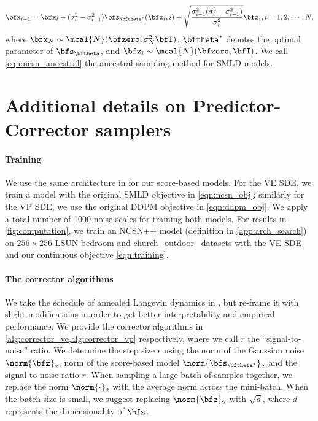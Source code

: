 \begin{align}
    \bfx_{i-1} = \bfx_i + (\sigma_i^2 - \sigma_{i-1}^2) \bfs_{\bftheta^*}(\bfx_i, i) + \sqrt{\frac{\sigma_{i-1}^2 (\sigma_i^2 - \sigma_{i-1}^2)}{\sigma_i^2}} \bfz_i, i=1,2,\cdots, N, \label{eqn:ncsn_ancestral}
\end{align}
where $\bfx_N \sim \mcal{N}(\bfzero, \sigma_N^2 \bfI)$, $\bftheta^*$ denotes the optimal parameter of $\bfs_\bftheta$, and $\bfz_i \sim \mcal{N}(\bfzero, \bfI)$. We call \cref{eqn:ncsn_ancestral} the ancestral sampling method for SMLD models.


\section{Additional details on Predictor-Corrector samplers}\label{app:pc}
\paragraph{Training} 
We use the same architecture in \cite{ho2020denoising} for our score-based models. For the VE SDE, we train a model with the original SMLD objective in \cref{eqn:ncsn_obj}; similarly for the VP SDE, we use the original DDPM objective in \cref{eqn:ddpm_obj}. We apply a total number of 1000 noise scales for training both models. For results in \cref{fig:computation}, we train an NCSN++ model (definition in \cref{app:arch_search}) on $256\times 256$ LSUN bedroom and church\_outdoor~\citep{yu2015lsun} datasets with the VE SDE and our continuous objective \cref{eqn:training}.

\paragraph{The corrector algorithms} We take the schedule of annealed Langevin dynamics in \citet{song2019generative}, but re-frame it with slight modifications in order to get better interpretability and empirical performance. We provide the corrector algorithms in \cref{alg:corrector_ve,alg:corrector_vp} respectively, where we call $r$ the ``signal-to-noise'' ratio. We determine the step size $\epsilon$ using the norm of the Gaussian noise $\norm{\bfz}_2$, norm of the score-based model $\norm{\bfs_{\bftheta^*}}_2$ and the signal-to-noise ratio $r$. When sampling a large batch of samples together, we replace the norm $\norm{\cdot}_2$ with the average norm across the mini-batch. When the batch size is small, we suggest replacing $\norm{\bfz}_2$ with $\sqrt{d}$, where $d$ represents the dimensionality of $\bfz$. 

